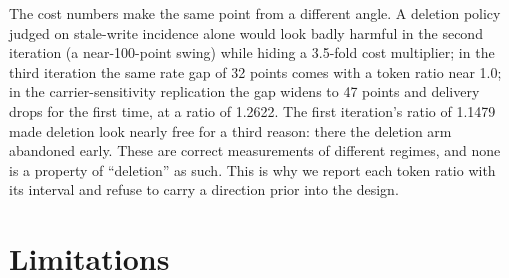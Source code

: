 \documentclass[11pt]{article}
\begin{document}
\begin{sloppypar}
The cost numbers make the same point from a different angle. A deletion policy judged on stale-write incidence alone would look badly harmful in the second iteration (a near-100-point swing) while hiding a 3.5-fold cost multiplier; in the third iteration the same rate gap of 32 points comes with a token ratio near 1.0; in the carrier-sensitivity replication the gap widens to 47 points and delivery drops for the first time, at a ratio of 1.2622. The first iteration's ratio of 1.1479 made deletion look nearly free for a third reason: there the deletion arm abandoned early. These are correct measurements of different regimes, and none is a property of ``deletion'' as such. This is why we report each token ratio with its interval and refuse to carry a direction prior into the design.

\section{Limitations}


\end{sloppypar}
\end{document}
